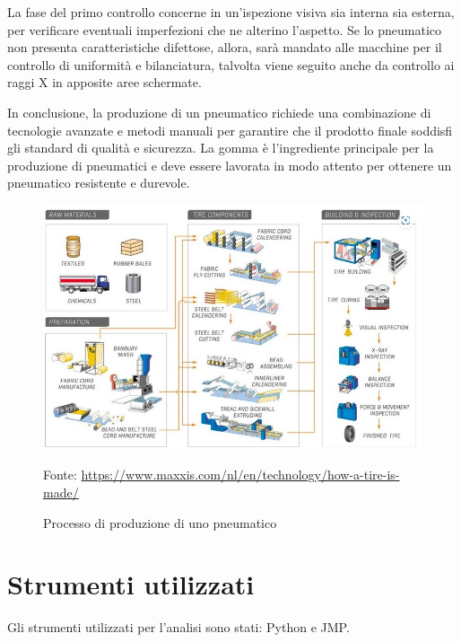 La fase del primo controllo concerne in un'ispezione visiva sia interna sia esterna, per verificare eventuali imperfezioni che ne alterino l'aspetto.
Se lo pneumatico non presenta caratteristiche difettose, allora, sarà mandato alle macchine per il controllo di uniformità e bilanciatura, talvolta viene seguito anche da controllo ai raggi X in apposite aree schermate. 
\cite{hilltoptire}
\cite{Madehow}



In conclusione, la produzione di un pneumatico richiede una combinazione di tecnologie avanzate e metodi manuali per garantire che il prodotto finale soddisfi gli standard di qualità e sicurezza. La gomma è l'ingrediente principale per la produzione di pneumatici e deve essere lavorata in modo attento per ottenere un pneumatico resistente e durevole. 

\clearpage
\begin{figure}[h]
  \centering
  \includegraphics[width=1\textwidth]{img/tyre-process.jpg}
  \caption{Processo di produzione di uno pneumatico} 
  Fonte: \url{https://www.maxxis.com/nl/en/technology/how-a-tire-is-made/} 
  \label{fig:tyre-process.jpg}
\end{figure}



\label{Stumenti utilizzati}
\section{Strumenti utilizzati}


Gli strumenti utilizzati per l'analisi sono stati: Python e JMP.

